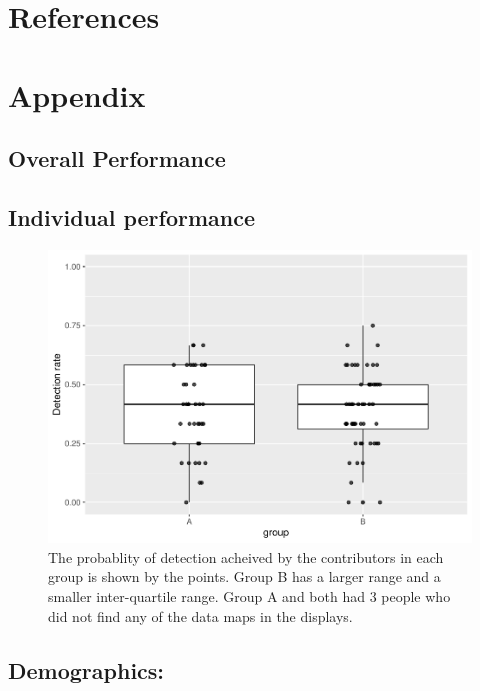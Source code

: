 \documentclass[conference,final,]{IEEEtran}
\makeatletter
\def\maxwidth{\ifdim\Gin@nat@width>\linewidth\linewidth
\else\Gin@nat@width\fi}
\let\Oldincludegraphics\includegraphics
\renewcommand{\includegraphics}[1]{\Oldincludegraphics[width=\maxwidth]{#1}}
\makeatother
\begin{document}
\hypertarget{references}{%
\section{References}\label{references}}

\newpage

\hypertarget{appendix}{%
\section{Appendix}\label{appendix}}

\hypertarget{overall-performance}{%
\subsection{Overall Performance}\label{overall-performance}}

\hypertarget{individual-performance}{%
\subsection{Individual performance}\label{individual-performance}}

\begin{figure}
\centering
\includegraphics{paper_files/figure-latex/contributors-1.pdf}
\caption{\label{fig:contributors}The probablity of detection acheived by the contributors in each group is shown by the points. Group B has a larger range and a smaller inter-quartile range. Group A and both had 3 people who did not find any of the data maps in the displays.}
\end{figure}

\hypertarget{demographics}{%
\subsection{Demographics:}\label{demographics}}
\end{document}
